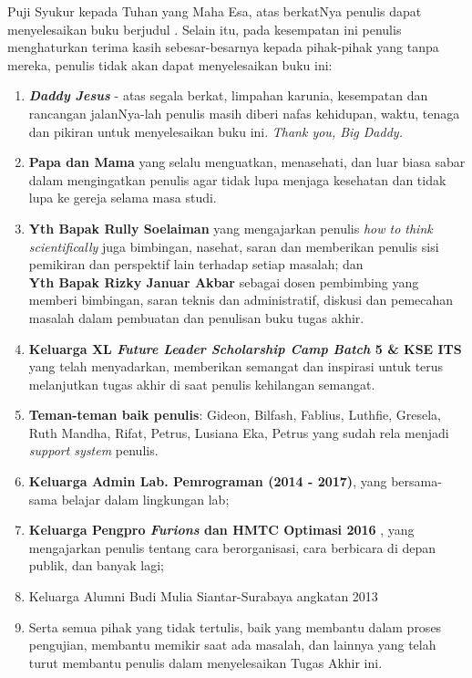 	  Puji Syukur kepada Tuhan yang Maha Esa, atas berkatNya penulis dapat menyelesaikan buku berjudul \textbf{\judul}. 
	  \newline
	  \indent Selain itu, pada kesempatan ini penulis menghaturkan terima kasih sebesar-besarnya kepada pihak-pihak yang tanpa mereka, penulis tidak akan dapat menyelesaikan buku ini:
  \begin{enumerate}
  	\item \textbf{\textit{Daddy Jesus}} - atas segala berkat, limpahan karunia, kesempatan dan rancangan jalanNya-lah penulis masih diberi nafas kehidupan, waktu, tenaga dan pikiran untuk menyelesaikan buku ini. \textit{Thank you, Big Daddy.}
    \item \textbf{Papa dan Mama} yang selalu menguatkan, menasehati, dan luar biasa sabar dalam mengingatkan penulis agar tidak lupa menjaga kesehatan dan tidak lupa ke gereja selama masa studi.
    \item \textbf{Yth Bapak Rully Soelaiman} yang mengajarkan penulis \textit{how to think scientifically} juga bimbingan, nasehat, saran dan memberikan penulis sisi pemikiran dan perspektif lain terhadap setiap masalah; dan \\
	    \textbf{Yth Bapak Rizky Januar Akbar} sebagai dosen pembimbing yang memberi bimbingan, saran teknis dan administratif, diskusi dan pemecahan masalah dalam pembuatan dan penulisan buku tugas akhir.
    \item \textbf{Keluarga XL \textit{Future Leader Scholarship Camp Batch} 5 \& KSE ITS} yang telah menyadarkan, memberikan semangat dan inspirasi untuk terus melanjutkan tugas akhir di saat penulis kehilangan semangat.
    \item \textbf{Teman-teman baik penulis}: Gideon, Bilfash, Fablius, Luthfie, Gresela, Ruth Mandha, Rifat, Petrus, Lusiana Eka, Petrus yang sudah rela menjadi \textit{support system} penulis.
    \item \textbf{Keluarga Admin Lab. Pemrograman (2014 - 2017)}, yang bersama-sama belajar dalam lingkungan lab;
    \item  \textbf{Keluarga Pengpro \textit{Furions} dan HMTC Optimasi 2016 }, yang mengajarkan penulis tentang cara berorganisasi, cara berbicara di depan publik, dan banyak lagi;
    \item Keluarga Alumni Budi Mulia Siantar-Surabaya angkatan 2013
    \item Serta semua pihak yang tidak tertulis, baik yang membantu dalam proses pengujian, membantu memikir saat ada masalah, dan lainnya yang telah turut membantu penulis dalam menyelesaikan Tugas Akhir ini.
  \end{enumerate}
  
